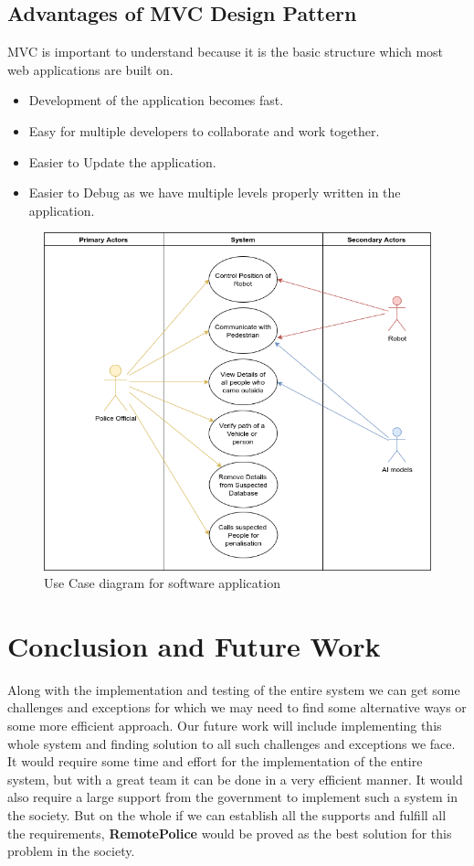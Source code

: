 \documentclass[10pt,twocolumn,letterpaper]{article}
\begin{document}
\subsection{Advantages of MVC Design Pattern}
MVC is important to understand because it is the basic structure which most web applications are built on. 
\begin{itemize}
\item Development of the application becomes fast.
\item Easy for multiple developers to collaborate and work together.
\item Easier to Update the application.
\item Easier to Debug as we have multiple levels properly written in the application.
\end{itemize}

\begin{figure}
  \includegraphics[width=\textwidth]{usecase.png}
  \caption{Use Case diagram for software application}
\end{figure}


\section{Conclusion and Future Work}
Along with the implementation and testing of the entire system we can get some challenges and exceptions for which we may need to find some alternative ways or some more efficient approach. Our future work will include implementing this whole system and finding solution to all such challenges and exceptions we face. It would require some time and effort for the implementation of the entire system, but with a great team it can be done in a very efficient manner. It would also require a large support from the government to implement such a system in the society. But on the whole if we can establish all the supports and fulfill all the requirements, \textbf{RemotePolice} would be proved as the best solution for this problem in the society.

{\small


}
\end{document}
